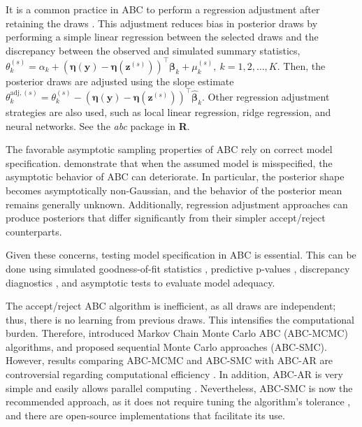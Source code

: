 It is a common practice in ABC to perform a regression adjustment after retaining the draws \cite{beaumont2002approximate, leuenberger2010bayesian, sisson2018handbook}. This adjustment reduces bias in posterior draws by performing a simple linear regression between the selected draws and the discrepancy between the observed and simulated summary statistics, \( {\theta}^{(s)}_k = \alpha_k + \left(\boldsymbol{\eta}(\boldsymbol{y}) - \boldsymbol{\eta}(\boldsymbol{z}^{(s)})\right)^{\top}\boldsymbol{\beta}_k + \mu^{(s)}_k, \ k=1,2,\dots,K \). Then, the posterior draws are adjusted using the slope estimate \( {\theta}^{\text{adj},(s)}_k = {\theta}^{(s)}_k - \left(\boldsymbol{\eta}(\boldsymbol{y}) - \boldsymbol{\eta}(\boldsymbol{z}^{(s)})\right)^{\top}\hat{\boldsymbol{\beta}}_k \). Other regression adjustment strategies are also used, such as local linear regression, ridge regression, and neural networks. See the \textit{abc} package in \textbf{R}.

The favorable asymptotic sampling properties of ABC rely on correct model specification. \cite{frazier2020model} demonstrate that when the assumed model is misspecified, the asymptotic behavior of ABC can deteriorate. In particular, the posterior shape becomes asymptotically non-Gaussian, and the behavior of the posterior mean remains generally unknown. Additionally, regression adjustment approaches can produce posteriors that differ significantly from their simpler accept/reject counterparts.

Given these concerns, testing model specification in ABC is essential. This can be done using simulated goodness-of-fit statistics \cite{bertorelle2010abc,lintusaari2017fundamentals}, predictive p-values \cite{bertorelle2010abc}, discrepancy diagnostics \cite{frazier2020model}, and asymptotic tests \cite{ramirez2024testing} to evaluate model adequacy.

The accept/reject ABC algorithm is inefficient, as all draws are independent; thus, there is no learning from previous draws. This intensifies the computational burden. Therefore, \cite{marjoram2003markov, wegmann2009efficient} introduced Markov Chain Monte Carlo ABC (ABC-MCMC) algorithms, and \cite{sisson2007sequential, drovandi2011estimation, del2012adaptive, lenormand2013adaptive} proposed sequential Monte Carlo approaches (ABC-SMC). However, results comparing ABC-MCMC and ABC-SMC with ABC-AR are controversial regarding computational efficiency \cite{bertorelle2010abc}. In addition, ABC-AR is very simple and easily allows parallel computing \cite{frazier2019approximate}. Nevertheless, ABC-SMC is now the recommended approach, as it does not require tuning the algorithm's tolerance \cite{martin2024approximating}, and there are open-source implementations that facilitate its use.

